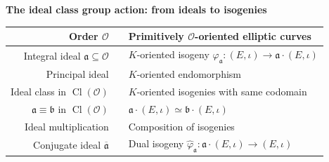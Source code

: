 \documentclass[10pt]{beamer}
\theoremstyle{plain}
\theoremstyle{definition}
\newcommand{\mO}{\mathcal{O}}
\renewcommand{\(}{\left(}
\renewcommand{\)}{\right)}
\newcommand{\mf}[1]{\mathfrak{#1}}
\DeclareMathOperator{\Cl}{Cl}
\begin{document}
\begin{frame}

\textbf{The ideal class group action: from ideals to isogenies}

\vspace{0.5cm}

\begin{center}
\begin{tabular}{rcl}

Order $\mO$ & & Primitively $\mO$-oriented elliptic curves \\ 
 \hline
 
 \rule{0pt}{4ex}   
 
Integral ideal $\mf{a}\subseteq \mO$ & & $K$-oriented isogeny $\varphi_{\mf{a}}:(E,\iota)\longrightarrow \mf{a}\cdot (E,\iota)$ \\

 \rule{0pt}{4ex}  

Principal ideal & & $K$-oriented endomorphism \\

 \rule{0pt}{4ex}  

Ideal class in $\Cl(\mO)$ & & $K$-oriented isogenies with same codomain\\
$\mf{a}\equiv \mf{b}$ in $\Cl(\mO)$ & & $ \mf{a}\cdot (E,\iota)\simeq  \mf{b}\cdot (E,\iota)$\\

 \rule{0pt}{4ex}  
 
Ideal multiplication & & Composition of isogenies\\

 \rule{0pt}{4ex}  

Conjugate ideal $\overline{\mf{a}}$  & & Dual isogeny $\hat{\varphi}_{\mf{a}}: \mf{a}\cdot (E,\iota)\longrightarrow (E,\iota)$\\

\end{tabular}
\end{center}

\end{frame}
\end{document}
